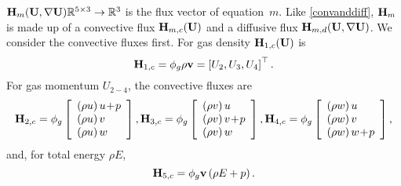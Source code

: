 ${\bf H}_m({\bf U},\nabla {\bf U}) \mathbb{R}^{5\times 3}\rightarrow \mathbb{R}^3$
is the flux vector of equation~$m$. Like \ref{convanddiff},
${\bf H}_m$ is made up of a convective flux ${\bf H}_{m,c}({\bf U})$ and a
diffusive flux ${\bf H}_{m,d}({\bf U},\nabla {\bf U})$. We consider the convective
fluxes first. For gas density ${\bf H}_{1,c}({\bf U})$ is
\begin{equation}\label{convh1}
   {\bf H}_{1,c}=\phi_g\rho \mathbf{v}= \left[U_2,U_3,U_4\right]^{\top}.
\end{equation}
For gas momentum $U_{2-4}$, the convective fluxes are
\begin{align}
   \bH_{2,c}=\phi_g\left[\begin{array}{l} \left(\rho u\right)u \!+\! p \\
                                               \left(\rho u\right)v \\
                                               \left(\rho u\right)w \end{array}\right],
   \bH_{3,c}=\phi_g\left[\begin{array}{l} \left(\rho v\right)u \\
                                               \left(\rho v\right)v \!+\! p \\
                                               \left(\rho v\right)w \end{array}\right], %
   \bH_{4,c}=\phi_g\left[\begin{array}{l} \left(\rho w\right)u \\
                                               \left(\rho w\right)v \\
                                               \left(\rho w\right)w \!+\! p \end{array}\right],  \label{convh2to4}
\end{align}
and, for total energy $\rho E$,
\begin{equation} \label{convh5}
   {\bf H}_{5,c}= \phi_g \mathbf{v}\left(\rho E +p\right).
\end{equation}

